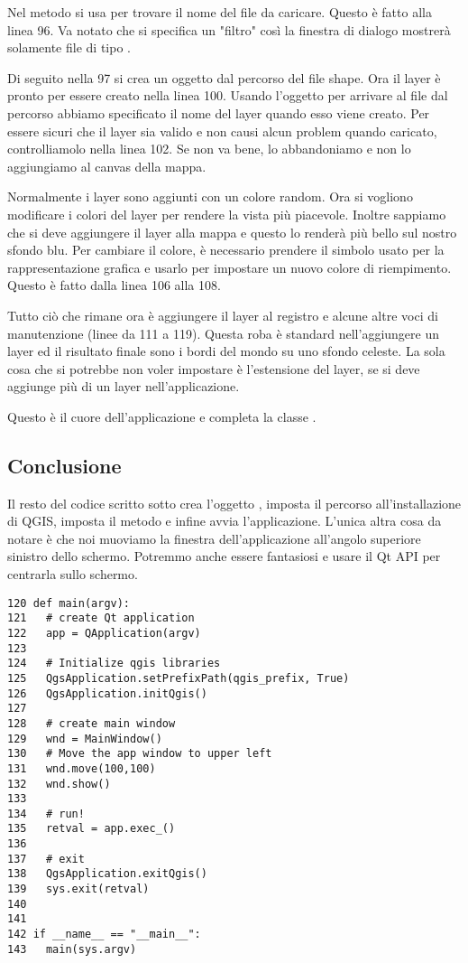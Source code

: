 Nel metodo  si usa  per trovare il nome del file da caricare. Questo è fatto alla linea 96. Va notato che si specifica un "filtro" così la finestra di dialogo mostrerà solamente file di tipo .

Di seguito nella 97 si crea un oggetto  dal percorso del file shape.  Ora il layer è pronto per essere creato nella linea 100. Usando l'oggetto  per arrivare al file dal percorso abbiamo specificato il nome del layer quando esso viene creato.  Per essere sicuri che il layer sia valido e non causi alcun problem quando caricato, controlliamolo nella linea 102. Se non va bene, lo abbandoniamo e non lo aggiungiamo al canvas della mappa.

Normalmente i layer sono aggiunti con un colore random. Ora si vogliono modificare i colori del layer per rendere la vista più piacevole. Inoltre sappiamo che si deve aggiungere il layer  alla mappa e questo lo renderà più bello sul nostro sfondo blu. Per cambiare il colore, è necessario prendere il simbolo usato per la rappresentazione grafica e usarlo per impostare un nuovo colore di riempimento. Questo è fatto dalla linea 106 alla 108. 

Tutto ciò che rimane ora è aggiungere il layer al registro e alcune altre voci di manutenzione (linee da 111 a 119). Questa roba è standard nell'aggiungere un layer ed il risultato finale sono i bordi del mondo su uno sfondo celeste. La sola cosa che si potrebbe non voler impostare è l'estensione del layer, se si deve aggiunge più di un layer nell'applicazione.

Questo è il cuore dell'applicazione e completa la classe . 

\subsection{Conclusione}

Il resto del codice scritto sotto crea l'oggetto , imposta il percorso all'installazione di QGIS, imposta il metodo  e infine avvia l'applicazione. L'unica altra cosa da notare è che noi muoviamo la finestra dell'applicazione all'angolo superiore sinistro dello schermo. Potremmo anche essere fantasiosi e usare il Qt API per centrarla sullo schermo.

\begin{verbatim}
120 def main(argv):
121   # create Qt application
122   app = QApplication(argv)
123 
124   # Initialize qgis libraries
125   QgsApplication.setPrefixPath(qgis_prefix, True)
126   QgsApplication.initQgis()
127 
128   # create main window
129   wnd = MainWindow()
130   # Move the app window to upper left
131   wnd.move(100,100)
132   wnd.show()
133 
134   # run!
135   retval = app.exec_()
136   
137   # exit
138   QgsApplication.exitQgis()
139   sys.exit(retval)
140 
141 
142 if __name__ == "__main__":
143   main(sys.argv)
\end{verbatim}

